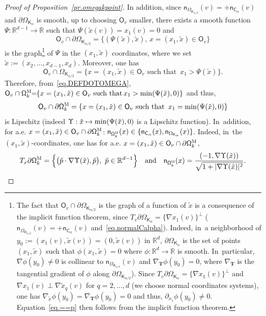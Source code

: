 \documentclass[JEP,XML,SOM,Unicode,NoEqCountersInSection,NoFloatCountersInSection,published]{cedram}
\newcommand\mto{\mathchoice{\longmapsto}{\mapsto}{\mapsto}{\mapsto}}
\newcommand{\quand}{\quad\text{and}\quad}
\newcommand{\mbf}[1]{\mathbf{#1}}
\let\pa\partial
\theoremstyle{plain}
\theoremstyle{definition}
\begin{document}
\begin{proof}[Proof of Proposition~\ref{pr.omegakpoint}]
In addition, since $\mathsf n_{\Omega_{\mathsf K_{\alpha/2}}}(v)= +\mathsf n_{\mathsf C_\alpha}(v)$ and $\partial \Omega_{\mathsf K_\alpha}$ is smooth, up to choosing $\mathsf O_v$ smaller, there exists a smooth function $\Psi: \mathbb R^{d-1} \to \mathbb R$ such that $\Psi(\tilde x(v))=x_1(v)=0$ and
\begin{equation}\label{eq.==p}
\mathsf O_v\cap \partial \Omega_{\mathsf K_{\alpha/2}}=\{(\Psi(\tilde x), \tilde x), \, x=(x_1,\tilde x)\in \mathsf O_v\}
\end{equation}
is the graph\footnote{The
fact that $\mathsf O_v\cap \partial \Omega_{\mathsf
K_{\alpha/2}}$ is the graph of a function of $\tilde x$ is a
consequence of the implicit function theorem, since $T_v\partial \Omega_{\mathsf K_\alpha}= \{\nabla {x_1}(v)\}^\bot$ ($\mathsf n_{\Omega_{\mathsf K_{\alpha/2}}}(v)= +\mathsf n_{\mathsf C_\alpha}(v)$ and~\eqref{eq.normalCalpha}). Indeed, in~a neighborhood of $y_0:=(x_1(v), \tilde x(v))=(0,\tilde x(v))$ in $\mathbb R^d$, $\partial \Omega_{\mathsf K_\alpha}$ is the set of points $(x_1,\tilde x)$ such that $\phi(x_1,\tilde x)=0$ where $\phi:\mathbb R^d\to \mathbb R$ is smooth. In~particular, $\nabla \phi(y_0)\neq 0$ is collinear to $\mathsf n_{\Omega_{\mathsf K_{\alpha/2}}}(v)$ and $\nabla_{\mbf T}\phi(y_0)=0$, where $\nabla_{\mbf T}$ is the tangential gradient of $\phi$ along $\partial \Omega_{\mathsf K_{\alpha/2}}$). Since $T_v\partial \Omega_{\mathsf K_\alpha}= \{\nabla {x_1}(v)\}^\bot$ and $\nabla {x_1}(v)\perp \nabla {\tilde x_q}(v)$ for $q=2,\ldots,d$ (we choose normal coordinates systems), one has $\nabla_{\tilde x}\phi(y_0)=\nabla_{\mbf T}\phi(y_0)=0$ and thus, $\partial_{x_1}\phi(y_0)\neq 0$. Equation~\eqref{eq.==p} then follows from the implicit function theorem.} of $\Psi$ in the $(x_1,\tilde x)$ coordinates, where
we set $\tilde x:=(x_2,\ldots, x_{d-1},x_d)$.
Moreover, one has
\[
\mathsf O_v\cap \Omega_{\mathsf K_{\alpha/2}}=\{x=(x_1,\tilde x)\in \mathsf O_v \text{ such that } \, x_1>\Psi(\tilde x)\}.
\]
Therefore, from~\eqref{eq.DEFDOTOMEGA},
$ \mathsf O_v\cap \mathsf \Omega_k^{\textsc{M}}\!\! =\!\! \{x=(x_1,\tilde x)\in \mathsf O_v \text{ such that} \, x_1>\min(\Psi(\tilde x),0)\}
$ and thus,
\[
\mathsf O_v\cap \pa \mathsf \Omega_k^{\textsc{M}} =\{x=(x_1,\tilde x)\in \mathsf O_v \text{ such that } \, x_1=\min(\Psi(\tilde x),0)\}
\]
is Lipschitz (indeed $\Upsilon: \tilde x\mto \min(\Psi(\tilde x),0)$ is a Lipschitz function). In~addition, for a.e. $x=(x_1,\tilde x)\in \mathsf O_v\cap \pa \mathsf \Omega_k^{\textsc{M}}$: $\mathsf n_{\mathsf \Omega_k^{\textsc{M}}}(x)\in \{ \mathsf n_{ \mathsf C_\alpha }(x), \mathsf n_{ \Omega_{\mathsf K_\alpha} }(x)\}$. Indeed, in~the $(x_1,\tilde x)$-coordinates, one has for a.e. $x=(x_1,\tilde x)\in \mathsf O_v\cap \pa \mathsf \Omega_k^{\textsc{M}}$,
\[
T_x \pa \mathsf \Omega_k^{\textsc{M}}=\Big\{\bigl(\tilde p\cdot \nabla \Upsilon (\tilde x), \tilde p\bigr), \ \tilde p \in \mathbb R^{d-1}\Big\} \quand \mathsf n_{\mathsf \Omega_k^{\textsc{M}}}(x)=\frac{(-1, \nabla \Upsilon (\tilde x))}{\sqrt{1+ \vert \nabla\Upsilon (\tilde x)\vert^2 }}.
\]


\end{proof}
\end{document}
